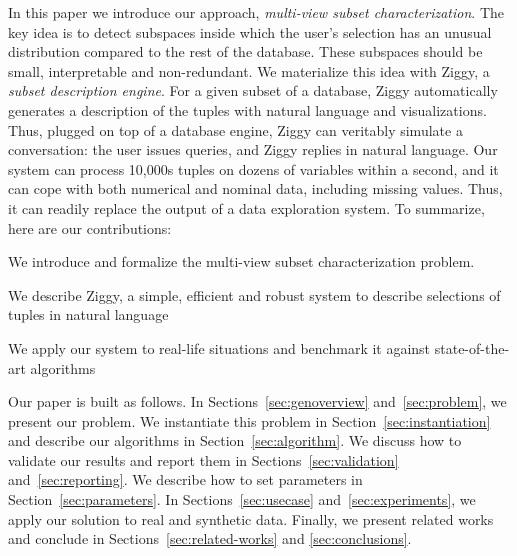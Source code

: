 In this paper we introduce our approach, \emph{multi-view subset
characterization}. The key idea is to detect subspaces inside which the user's
selection has an unusual distribution compared to the rest of the database.
These subspaces should be small, interpretable and non-redundant.  We
materialize this idea with Ziggy, a \emph{subset description engine}. For a
given subset of a database, Ziggy automatically generates a description of the
tuples with natural language and visualizations.  Thus, plugged on top of a
database engine, Ziggy can veritably simulate a conversation: the
user issues queries, and Ziggy replies in natural language. Our system can
process 10,000s tuples on dozens of variables within a second, and it can cope with
both numerical and nominal data, including missing values.  Thus, it can
readily replace the output of a data exploration system. To summarize, here are
our contributions: \begin{itemize0}
    \item We introduce and formalize the multi-view subset characterization problem.
    \item We describe Ziggy, a simple, efficient and robust system to describe
        selections of tuples in natural language
    \item We apply our system to real-life situations and benchmark it against
        state-of-the-art algorithms
\end{itemize0}

Our paper is built as follows. In Sections~\ref{sec:genoverview}
and~\ref{sec:problem}, we present our problem. We instantiate this problem in
Section~\ref{sec:instantiation} and describe our algorithms in
Section~\ref{sec:algorithm}. We discuss how to validate our results and report
them in Sections~\ref{sec:validation} and~\ref{sec:reporting}. We describe how
to set parameters in Section~\ref{sec:parameters}. In
Sections~\ref{sec:usecase} and~\ref{sec:experiments}, we apply our solution to
real and synthetic data. Finally, we present related works and conclude in
Sections~\ref{sec:related-works} and \ref{sec:conclusions}.

